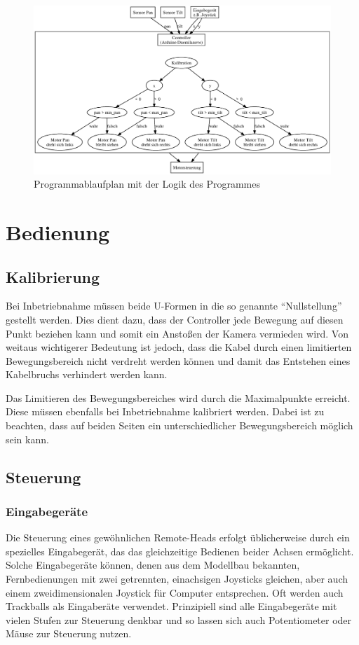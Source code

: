 \documentclass[a4paper, 12pt, bibtotocnumbered, liststotocnumbered]{scrartcl}
\begin{document}
	\begin{figure}[htb]
		\centering
		\includegraphics[scale=0.7,angle=90]{Bilder/Programmablaufplan}
		\caption{Programmablaufplan mit der Logik des Programmes}
		\label{Programmablaufplan}
	\end{figure}

	\section{Bedienung}
	\subsection{Kalibrierung}
	Bei Inbetriebnahme müssen beide U-Formen in die so genannte “Nullstellung” gestellt werden. Dies dient dazu, dass der Controller jede Bewegung auf diesen Punkt beziehen kann und somit ein Anstoßen der Kamera vermieden wird. Von weitaus wichtigerer Bedeutung ist jedoch, dass die Kabel durch einen limitierten Bewegungsbereich nicht verdreht werden können und damit das Entstehen eines Kabelbruchs verhindert werden kann.

	Das Limitieren des Bewegungsbereiches wird durch die Maximalpunkte erreicht. Diese müssen ebenfalls bei Inbetriebnahme kalibriert werden. Dabei ist zu beachten, dass auf beiden Seiten ein unterschiedlicher Bewegungsbereich möglich sein kann.

	\subsection{Steuerung}
	\subsubsection{Eingabegeräte}
	Die Steuerung eines gewöhnlichen Remote-Heads erfolgt üblicherweise durch ein spezielles Eingabegerät, das das gleichzeitige Bedienen beider Achsen ermöglicht. Solche Eingabegeräte können, denen aus dem Modellbau bekannten, Fernbedienungen mit zwei getrennten, einachsigen Joysticks gleichen, aber auch einem zweidimensionalen Joystick für Computer entsprechen. Oft werden auch Trackballs als Eingaberäte verwendet. Prinzipiell sind alle Eingabegeräte mit vielen Stufen zur Steuerung denkbar und so lassen sich auch Potentiometer oder Mäuse zur Steuerung nutzen.
\end{document}
